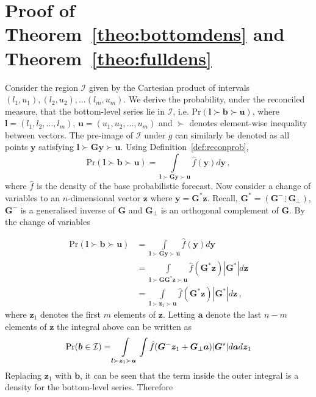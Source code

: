\documentclass[12pt]{article}
\theoremstyle{definition}
\begin{document}
\newpage

\appendix

\section{Proof of Theorem~\ref{theo:bottomdens} and Theorem~\ref{theo:fulldens}} \label{app:Bottom&FullDens}

Consider the region $\mathcal{I}$ given by the Cartesian product of intervals $(l_1,u_1),(l_2,u_2),\ldots(l_m,u_m)$.  We derive the probability, under the reconciled measure, that the bottom-level series lie in $\mathcal{I}$, i.e. $\mbox{Pr}(\bm{l}\succ\bm{b}\succ\bm{u})$, where ${\bm l}=(l_1,l_2,\ldots,l_m)$, ${\bm u}=(u_1,u_2,\ldots,u_m)$ and $\succ$ denotes element-wise inequality between vectors.  The pre-image of $\mathcal{I}$ under $g$ can similarly be denoted as all points ${\bm y}$ satisfying $\bm{l}\succ\bm{G}\bm{y}\succ\bm{u}$.  Using Definition~\ref{def:reconprob},
\[
\mbox{Pr}(\bm{l}\succ\bm{b}\succ\bm{u})=\int\limits_{\bm{l}\succ\bm{G}\bm{y}\succ\bm{u}}\hat{f}(\bm{y})d{\bm y}\,,
\]
where $\hat{f}$ is the density of the base probabilistic forecast.  Now consider a change of variables to an $n$-dimensional vector ${\bm z}$ where $\bm{y}={\bm G^*}{\bm z}$. Recall, ${\bm G^*}=\left({\bm G^{-}}\,\vdots\,{\bm G_\perp}\right)$, ${\bm G^{-}}$ is a generalised inverse of $\bm{G}$ and ${\bm G_\perp}$ is an orthogonal complement of $\bm{G}$.  By the change of variables

\begin{align}
\mbox{Pr}(\bm{l}\succ\bm{b}\succ\bm{u})&=\int\limits_{\bm{l}\succ\bm{G}\bm{y}\succ\bm{u}}\hat{f}(\bm{y})d{\bm y}\nonumber\\
&=\int\limits_{\bm{l}\succ\bm{G}\bm{G}^*\bm{z}\succ\bm{u}}\hat{f}(\bm{G}^*\bm{z})|\bm{G}^*|d{\bm z}\nonumber\\
&=\int\limits_{\bm{l}\succ\bm{z}_1\succ\bm{u}}\hat{f}(\bm{G}^*\bm{z})|\bm{G}^*|d{\bm z}\nonumber\,,
\end{align}
where $\bm{z}_1$ denotes the first $m$ elements of $\bm z$.  Letting $\bm{a}$ denote the last $n-m$ elements of $\bm{z}$ the integral above can be written as
\[
\mbox{Pr}({\bm b}\in \mathcal{I})=\int\limits_{\bm{l}\succ\bm{z}_1\succ\bm{u}}\int\hat{f}(\bm{G}^{-}\bm{z}_1+\bm{G}_{\perp}\bm{a})|\bm{G}^*|d{\bm a}d{\bm z}_1\nonumber\\
\]
Replacing ${\bm z}_1$ with ${\bm b}$, it can be seen that the term inside the outer integral is a density for the bottom-level series. Therefore
\end{document}

